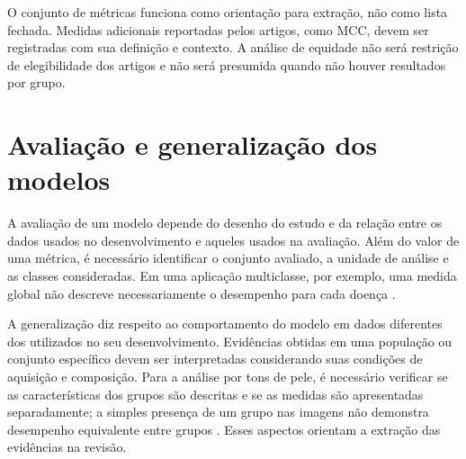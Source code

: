 O conjunto de métricas funciona como orientação para extração, não como
lista fechada. Medidas adicionais reportadas pelos artigos, como MCC,
devem ser registradas com sua definição e contexto. A análise de
equidade não será restrição de elegibilidade dos artigos e não será
presumida quando não houver resultados por grupo.


\section{Avaliação e generalização dos modelos}

A avaliação de um modelo depende do desenho do estudo e da relação entre
os dados usados no desenvolvimento e aqueles usados na avaliação. Além do
valor de uma métrica, é necessário identificar o conjunto avaliado, a unidade
de análise e as classes consideradas. Em uma aplicação multiclasse, por
exemplo, uma medida global não descreve necessariamente o desempenho para
cada doença .

A generalização diz respeito ao comportamento do modelo em dados diferentes
dos utilizados no seu desenvolvimento. Evidências obtidas em uma população
ou conjunto específico devem ser interpretadas considerando suas condições
de aquisição e composição. Para a análise por tons de pele, é necessário
verificar se as características dos grupos são descritas e se as medidas
são apresentadas separadamente; a simples presença de um grupo nas imagens
não demonstra desempenho equivalente entre grupos .
Esses aspectos orientam a extração das evidências na revisão.
